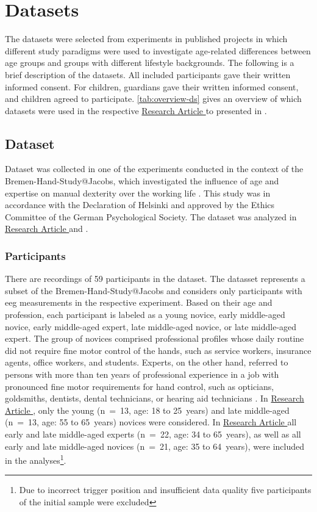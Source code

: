 \section{Datasets}
The datasets were selected from experiments in published projects in which different study paradigms were used to investigate age-related differences between age groups and groups with different lifestyle backgrounds. The following is a brief description of the datasets. All included participants gave their written informed consent. For children, guardians gave their written informed consent, and children agreed to participate. \autoref{tab:overview-ds} gives an overview of which datasets were used in the respective \hyperref[results:paperI]{Research Article } to \hyperref[results:paperIV]{} presented in .

\subsection{Dataset }
\label{methods:datasets:I}
Dataset  was collected in one of the experiments conducted in the context of the Bremen-Hand-Study@Jacobs, which investigated the influence of age and expertise on manual dexterity over the working life \cite{Voelcker-Rehage2013}. This study was in accordance with the Declaration of Helsinki and approved by the Ethics Committee of the German Psychological Society. The dataset was analyzed in \hyperref[results:paperI]{Research Article } and \hyperref[results:paperIV]{}. 

\subsubsection{Participants}
\label{methods:datasets:I:participants}
There are recordings of 59 participants in the dataset. The datasset represents a subset of the Bremen-Hand-Study@Jacobs and considers only participants with \gls{eeg} measurements in the respective experiment. Based on their age and profession, each participant is labeled as a young novice, early middle-aged novice, early middle-aged expert, late middle-aged novice, or late middle-aged expert. The group of novices comprised professional profiles whose daily routine did not require fine motor control of the hands, such as service workers, insurance agents, office workers, and students. Experts, on the other hand, referred to persons with more than ten years of professional experience in a job with pronounced fine motor requirements for hand control, such as opticians, goldsmiths, dentists, dental technicians, or hearing aid technicians \cite{Ericsson1991}. In \hyperref[results:paperI]{Research Article }, only the young (n~=~13, age: 18 to 25~years) and late middle-aged (n~=~13, age: 55 to 65~years) novices were considered. In \hyperref[results:paperIV]{Research Article } all early and late middle-aged experts (n~=~22, age: 34 to 65~years), as well as all early and late middle-aged novices (n~=~21, age: 35 to 64~years), were included in the analyses\footnote{Due to incorrect trigger position and insufficient data quality five participants of the initial sample were excluded}.

